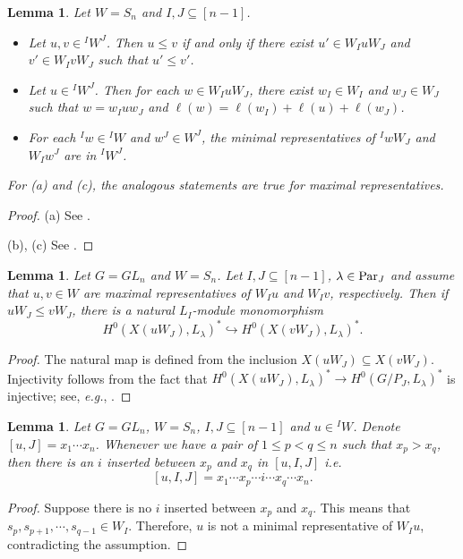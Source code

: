 \documentclass[12pt]{amsart}
\newtheorem{lemma}[theorem]{Lemma}
\theoremstyle{definition}
\theoremstyle{remark}
\newcommand{\Parj}{{\rm Par}_J}
\begin{document}
\begin{lemma}\label{lem3.0}
Let $W=S_n$ and $I,J \subseteq [n-1]$.
\begin{itemize}
\item[(a)] Let $u, v \in {}^I W^J$. Then $u \leq v$ if and only if there exist $u' \in W_I u W_J$ and $v' \in W_I v W_J$ such that $u' \leq v'$.
\item[(b)] Let $u \in {}^I W^J$. Then for each $w \in W_I u W_J$, there exist $w_I \in W_I$ and $w_J \in W_J$ such that $w = w_I u w_J$ and $\ell (w) = \ell (w_I) + \ell (u) + \ell (w_J)$.
\item[(c)] For each ${}^I w \in {}^I W$ and $w^J \in W^J$, the minimal representatives of ${}^I w W_J$ and $W_I w^J$ are in ${}^I W^J$.
\end{itemize}
For (a) and (c), the analogous statements are true for maximal representatives.
\end{lemma}
\begin{proof}
(a) See \cite[Lemma 3.5]{MR0435249}.

(b), (c) See \cite[Proposition 1.8]{MR2120109}.
\end{proof}

\begin{lemma}\label{lem2.5}
Let $G = GL_n$ and $W = S_n$. Let $I, J \subseteq [n-1]$, $\lambda \in \Parj$ and assume that $u , v \in W$ are maximal representatives of $W_I u$ and $W_I v$, respectively. Then if $uW_J \leq vW_J$, there is a natural $L_I$-module monomorphism
\begin{equation}\label{eqn2.4}
H^0 (X(uW_J),L_\lambda)^* \hookrightarrow H^0(X(vW_J),L_\lambda)^*.
\end{equation}
\end{lemma}
\begin{proof}
The natural map is defined from the inclusion $X(uW_J) \subseteq X(vW_J)$. Injectivity follows from the fact that $H^0(X(uW_J),L_\lambda )^* \rightarrow H^0(G/P_J , L_\lambda)^*$ is injective; see, \textit{e.g.}, \cite[II Proposition~14.15]{MR2015057}.
\end{proof}

\begin{lemma}\label{lem2.6}
Let $G=GL_n$, $W=S_n$, $I,J \subseteq [n-1]$ and $u \in {}^I W$. Denote $[u,J] = x_1 \cdots x_n$. Whenever we have a pair of $1\leq p<q \leq n$ such that $x_p > x_q$, then there is an $i$ inserted between $x_p$ and $x_q$ in $[u,I,J]$ \textit{i.e.}
\begin{equation}\label{eqn2.5}
[u,I,J] = x_1 \cdots x_p \cdots i \cdots x_q \cdots x_n.
\end{equation}
\end{lemma}
\begin{proof}
Suppose there is no $i$ inserted between $x_p$ and $x_q$. This means that $s_{p} , s_{p+1} , \cdots , s_{q-1} \in W_I$. Therefore, $u$ is not a minimal representative of $W_I u$, contradicting the assumption.
\end{proof}
\end{document}
